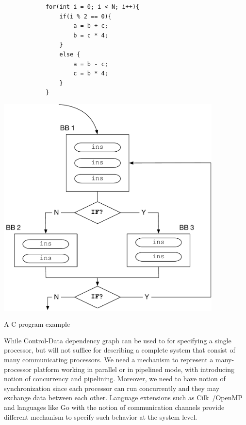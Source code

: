 \begin{listing}[!h]
    \begin{minipage}{0.5\textwidth}
        \begin{verbatim}
            for(int i = 0; i < N; i++){
                if(i % 2 == 0){
                    a = b + c;
                    b = c * 4;
                }
                else {
                    a = b - c;
                    c = b * 4;
                }
            }
        \end{verbatim}
    \end{minipage}
    \begin{minipage}{0.5\textwidth}
       \includegraphics[width=0.85\textwidth]{figures/Introduction/CFG.pdf}
    \end{minipage}
    \caption{A C program example}
    \label{fig:c_example}
\end{listing}


While Control-Data dependency graph can be used to for specifying a single processor, but will not suffice for describing a complete system that consist of many communicating processors.
We need a mechanism to represent a many-processor platform working in parallel
or in pipelined mode, with introducing notion of concurrency and pipelining.
Moreover, we need to have notion of synchronization since each processor can run concurrently and they may exchange data between each other.
Language extensions such as Cilk~\cite{cilk}/OpenMP and languages like Go with the notion of communication channels provide different mechanism to specify such behavior at the system level.

